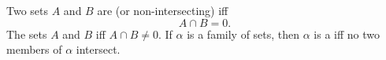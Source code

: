 Two sets $A$ and $B$ are  (or non-intersecting) iff
$$
A \cap B = 0.
$$
The sets $A$ and $B$  iff $A \cap B \neq 0$.
If $\alpha$ is a family of sets, then $\alpha$ is a  iff no two members of $\alpha$ intersect.
